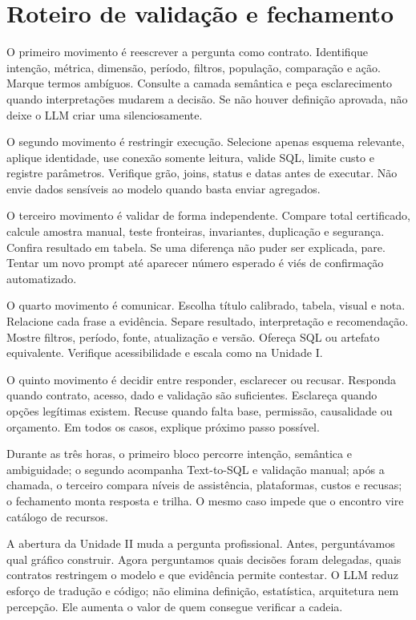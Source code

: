 \section{Roteiro de validação e fechamento}

O primeiro movimento é reescrever a pergunta como contrato. Identifique intenção, métrica, dimensão, período, filtros, população, comparação e ação. Marque termos ambíguos. Consulte a camada semântica e peça esclarecimento quando interpretações mudarem a decisão. Se não houver definição aprovada, não deixe o LLM criar uma silenciosamente.

O segundo movimento é restringir execução. Selecione apenas esquema relevante, aplique identidade, use conexão somente leitura, valide SQL, limite custo e registre parâmetros. Verifique grão, joins, status e datas antes de executar. Não envie dados sensíveis ao modelo quando basta enviar agregados.

O terceiro movimento é validar de forma independente. Compare total certificado, calcule amostra manual, teste fronteiras, invariantes, duplicação e segurança. Confira resultado em tabela. Se uma diferença não puder ser explicada, pare. Tentar um novo prompt até aparecer número esperado é viés de confirmação automatizado.

O quarto movimento é comunicar. Escolha título calibrado, tabela, visual e nota. Relacione cada frase a evidência. Separe resultado, interpretação e recomendação. Mostre filtros, período, fonte, atualização e versão. Ofereça SQL ou artefato equivalente. Verifique acessibilidade e escala como na Unidade I.

O quinto movimento é decidir entre responder, esclarecer ou recusar. Responda quando contrato, acesso, dado e validação são suficientes. Esclareça quando opções legítimas existem. Recuse quando falta base, permissão, causalidade ou orçamento. Em todos os casos, explique próximo passo possível.

Durante as três horas, o primeiro bloco percorre intenção, semântica e ambiguidade; o segundo acompanha Text-to-SQL e validação manual; após a chamada, o terceiro compara níveis de assistência, plataformas, custos e recusas; o fechamento monta resposta e trilha. O mesmo caso impede que o encontro vire catálogo de recursos.

A abertura da Unidade II muda a pergunta profissional. Antes, perguntávamos qual gráfico construir. Agora perguntamos quais decisões foram delegadas, quais contratos restringem o modelo e que evidência permite contestar. O LLM reduz esforço de tradução e código; não elimina definição, estatística, arquitetura nem percepção. Ele aumenta o valor de quem consegue verificar a cadeia.

